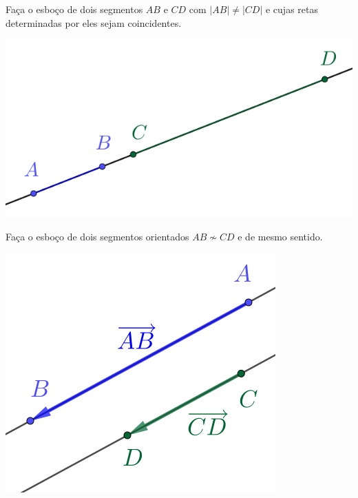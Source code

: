 \begin{exer}\label{cap_vetor_sec_segorien:fig:exer_segs_dif_normas}
  Faça o esboço de dois segmentos $AB$ e $CD$ com $|AB|\neq |CD|$ e cujas retas determinadas por eles sejam coincidentes.
\end{exer}
\begin{resp}

  \includegraphics{./cap_vetor/dados/fig_exer_segs_dif_normas/fig.png}
\end{resp}

\begin{exer}\label{cap_vetor_sec_segorien:fig:exer_segs_nems}
  Faça o esboço de dois segmentos orientados $AB\not\sim CD$ e de mesmo sentido.
\end{exer}
\begin{resp}
  
  \includegraphics{./cap_vetor/dados/fig_exer_segs_nems/fig.png}
\end{resp}

